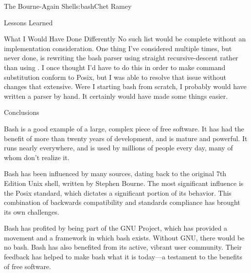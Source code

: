 \begin{aosachapter}{The Bourne-Again Shell}{s:bash}{Chet Ramey}
\begin{aosasect1}{Lessons Learned}
\begin{aosasect2}{What I Would Have Done Differently}
No such list would be complete without an implementation
consideration.  One thing I've considered multiple times, but never
done, is rewriting the bash parser using straight recursive-descent
rather than using .  I once thought I'd have to do this in
order to make command substitution conform to Posix, but I was able to
resolve that issue without changes that extensive.  Were I starting
bash from scratch, I probably would have written a parser by hand.  It
certainly would have made some things easier.

\end{aosasect2}

\end{aosasect1}

\begin{aosasect1}{Conclusions}

Bash is a good example of a large, complex piece of free software.  It
has had the benefit of more than twenty years of development, and is
mature and powerful.  It runs nearly everywhere, and is used by
millions of people every day, many of whom don't realize it.

Bash has been influenced by many sources, dating back to the original
7th Edition Unix shell, written by Stephen Bourne.  The most
significant influence is the Posix standard, which dictates a
significant portion of its behavior.  This combination of backwards
compatibility and standards compliance has brought its own challenges.

Bash has profited by being part of the GNU Project, which has provided
a movement and a framework in which bash exists.  Without GNU, there
would be no bash.  Bash has also benefited from its active, vibrant
user community.  Their feedback has helped to make bash what it is
today---a testament to the benefits of free software.

\end{aosasect1}

\end{aosachapter}
